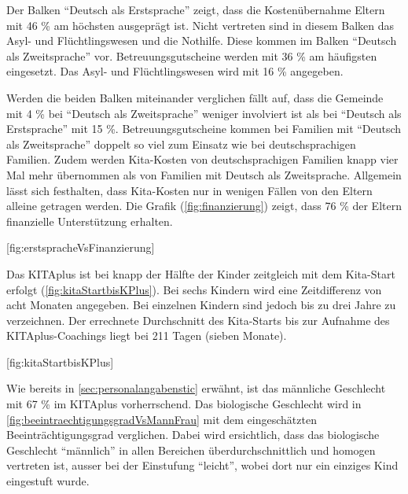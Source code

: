 \documentclass[
  ngerman,
  11pt,
  paper=a4,
  twoside,
  titlepage=true,
  openright,
  abstract=on,
  toc=listofnumbered,
  numbers=noenddot,
  chapterprefix=true,
  headings=optiontohead,
  svgnames,
  dvipsnames]{scrreprt}
\begin{document}
Der Balken “Deutsch als Erstsprache” zeigt, dass die Kostenübernahme
Eltern mit 46 \% am höchsten ausgeprägt ist. Nicht vertreten sind in
diesem Balken das Asyl- und Flüchtlingswesen und die Nothilfe. Diese
kommen im Balken “Deutsch als Zweitsprache” vor. Betreuungsgutscheine
werden mit 36 \% am häufigsten eingesetzt. Das Asyl- und
Flüchtlingswesen wird mit 16 \% angegeben.

Werden die beiden Balken miteinander verglichen fällt auf, dass die
Gemeinde mit 4 \% bei “Deutsch als Zweitsprache” weniger involviert ist
als bei “Deutsch als Erstsprache” mit 15 \%. Betreuungsgutscheine kommen
bei Familien mit “Deutsch als Zweitsprache” doppelt so viel zum Einsatz
wie bei deutschsprachigen Familien. Zudem werden Kita-Kosten von
deutschsprachigen Familien knapp vier Mal mehr übernommen als von
Familien mit Deutsch als Zweitsprache. Allgemein lässt sich festhalten,
dass Kita-Kosten nur in wenigen Fällen von den Eltern alleine getragen
werden. Die Grafik (\cref{fig:finanzierung}) zeigt, dass 76 \% der
Eltern finanzielle Unterstützung erhalten.

[fig:erstspracheVsFinanzierung]

Das KITAplus ist bei knapp der Hälfte der Kinder zeitgleich mit dem
Kita-Start erfolgt (\cref{fig:kitaStartbisKPlus}). Bei sechs Kindern
wird eine Zeitdifferenz von acht Monaten angegeben. Bei einzelnen
Kindern sind jedoch bis zu drei Jahre zu verzeichnen. Der errechnete
Durchschnitt des Kita-Starts bis zur Aufnahme des KITAplus-Coachings
liegt bei 211 Tagen (sieben Monate).

[fig:kitaStartbisKPlus]

Wie bereits in \cref{sec:personalangabenstic} erwähnt, ist das männliche
Geschlecht mit 67 \% im KITAplus vorherrschend. Das biologische
Geschlecht wird in \cref{fig:beeintraechtigungsgradVsMannFrau} mit dem
eingeschätzten Beeinträchtigungsgrad verglichen. Dabei wird ersichtlich,
dass das biologische Geschlecht “männlich” in allen Bereichen
überdurchschnittlich und homogen vertreten ist, ausser bei der
Einstufung “leicht”, wobei dort nur ein einziges Kind eingestuft wurde.
\end{document}
